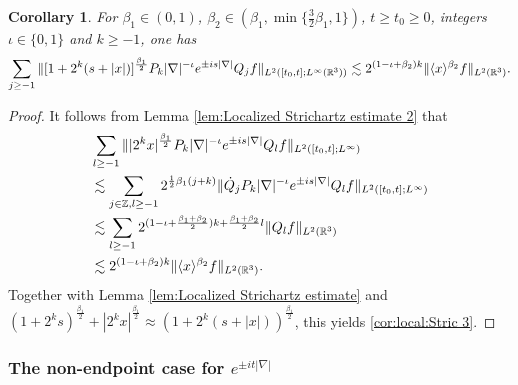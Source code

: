 \documentclass[11pt,twoside]{article}
\def\Z{\mathop{\mathbb Z\kern 0pt}\nolimits}
\def\R{\mathop{\mathbb R\kern 0pt}\nolimits}
\def\f{\frac}
\def\ls{\lesssim}
\newcommand{\w}[1]{\langle {#1} \rangle}
\newcommand{\q}{\dot{Q}}
\theoremstyle{plain}
\newtheorem{cor}[theorem]{Corollary}
\theoremstyle{definition}
\numberwithin{equation}{section}
\begin{document}
	\begin{cor}\label{cor:Localized Strichartz estimate 2}
		For $\beta_1\in(0,1)$, $\beta_2\in(\beta_1,\min\{\f32\beta_1,1\})$, $t\ge t_0\ge 0$,
integers $\iota\in\{0,1\}$ and $k\ge -1$, one has
			\begin{equation}\label{cor:local:Stric 3}
				\sum_{j\ge-1}\|[1+2^k(s+|x|)]^{\f{\beta_1}{2}}P_{k}|\nabla|^{-\iota}e^{\pm is|\nabla|}Q_jf\|_{L^2([t_0,t];L^\infty(\R^3))}
				\ls	2^{(1-\iota+\beta_2) k}\| \w{x}^{\beta_2} f\|_{L^2(\R^3)}.
		\end{equation}
	\end{cor}
	\begin{proof}
		It follows from Lemma \ref{lem:Localized Strichartz estimate 2} that
		\begin{equation*}
			\begin{split}
				&\sum_{l\ge-1}\||2^kx|^{\f{\beta_1}{2}}P_{k}|\nabla|^{-\iota}e^{\pm is|\nabla|}Q_lf\|_{L^2([t_0,t];L^\infty)}\\
				&\ls
				\sum_{j\in\Z,l\ge-1}2^{\f12 \beta_1 (j+k)}\|\q_jP_{k}|\nabla|^{-\iota}e^{\pm is|\nabla|}Q_lf\|_{L^2([t_0,t];L^\infty)}\\
				&\ls
				\sum_{l\ge-1}2^{(1-\iota+\f{\beta_1+\beta_2}{2}) k+\f{\beta_1+\beta_2}{2}l}\|Q_lf\|_{L^2(\R^3)}\\
				&\ls
				2^{(1-\iota+\beta_2 ) k}\| \w{x}^{\beta_2} f\|_{L^2(\R^3)}.
			\end{split}
		\end{equation*}
		Together with Lemma \ref{lem:Localized Strichartz estimate} and
$(1+2^ks)^{\f{\beta_1}{2}}+|2^kx|^{\f{\beta_1}{2}}\approx(1+2^k(s+|x|))^{\f{\beta_1}{2}}$, this yields \eqref{cor:local:Stric 3}.
	\end{proof}

	\subsubsection{The non-endpoint case for $e^{\pm it|\nabla|}$}
\end{document}
